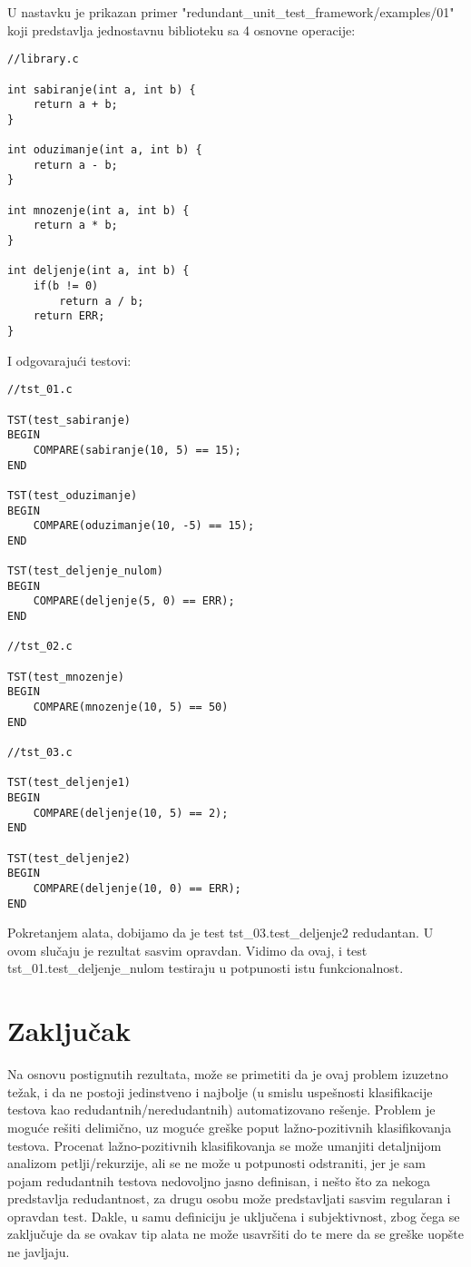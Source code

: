 \documentclass[a4paper]{article}
\begin{document}
U nastavku je prikazan primer "redundant\_unit\_test\_framework/examples/01" koji predstavlja jednostavnu biblioteku sa 4 osnovne operacije:

\begin{lstlisting}
//library.c

int sabiranje(int a, int b) {
	return a + b;
}

int oduzimanje(int a, int b) {
	return a - b;
}

int mnozenje(int a, int b) {
	return a * b;
}

int deljenje(int a, int b) {
	if(b != 0)
		return a / b;
	return ERR;
}
\end{lstlisting}

I odgovarajući testovi:

\begin{lstlisting}
//tst_01.c

TST(test_sabiranje)
BEGIN
	COMPARE(sabiranje(10, 5) == 15);
END

TST(test_oduzimanje)
BEGIN
	COMPARE(oduzimanje(10, -5) == 15);
END

TST(test_deljenje_nulom)
BEGIN
	COMPARE(deljenje(5, 0) == ERR);
END

//tst_02.c

TST(test_mnozenje)
BEGIN
	COMPARE(mnozenje(10, 5) == 50)
END

//tst_03.c

TST(test_deljenje1)
BEGIN
	COMPARE(deljenje(10, 5) == 2);
END

TST(test_deljenje2)
BEGIN
	COMPARE(deljenje(10, 0) == ERR);
END
\end{lstlisting}

Pokretanjem alata, dobijamo da je test tst\_03.test\_deljenje2 redudantan. U ovom slučaju je rezultat sasvim opravdan. Vidimo da ovaj, i test tst\_01.test\_deljenje\_nulom testiraju u potpunosti istu funkcionalnost.


\section{Zaključak}
\label{sec:zakljucak}
Na osnovu postignutih rezultata, može se primetiti da je ovaj problem izuzetno težak, i da ne postoji jedinstveno i najbolje (u smislu uspešnosti klasifikacije testova kao redudantnih/neredudantnih) automatizovano rešenje. Problem je moguće rešiti delimično, uz moguće greške poput lažno-pozitivnih klasifikovanja testova. Procenat lažno-pozitivnih klasifikovanja se može umanjiti detaljnijom analizom petlji/rekurzije, ali se ne može u potpunosti odstraniti, jer je sam pojam redudantnih testova nedovoljno jasno definisan, i nešto što za nekoga predstavlja redudantnost, za drugu osobu može predstavljati sasvim regularan i opravdan test. Dakle, u samu definiciju je uključena i subjektivnost, zbog čega se zaključuje da se ovakav tip alata ne može usavršiti do te mere da se greške uopšte ne javljaju.
\end{document}
